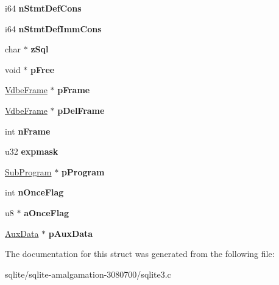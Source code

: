 \begin{DoxyCompactItemize}
\item 
\hypertarget{struct_vdbe_ab6a710cd4796c6adc8967e7b5bf35757}{i64 {\bfseries n\+Stmt\+Def\+Cons}}\label{struct_vdbe_ab6a710cd4796c6adc8967e7b5bf35757}

\item 
\hypertarget{struct_vdbe_acc12695377eb8b25107876145704c496}{i64 {\bfseries n\+Stmt\+Def\+Imm\+Cons}}\label{struct_vdbe_acc12695377eb8b25107876145704c496}

\item 
\hypertarget{struct_vdbe_a5a61fd8f84ae0399ef73327e48048ae9}{char $\ast$ {\bfseries z\+Sql}}\label{struct_vdbe_a5a61fd8f84ae0399ef73327e48048ae9}

\item 
\hypertarget{struct_vdbe_a68dcaae5d4f061da3d7bb96c120fe9a4}{void $\ast$ {\bfseries p\+Free}}\label{struct_vdbe_a68dcaae5d4f061da3d7bb96c120fe9a4}

\item 
\hypertarget{struct_vdbe_afd754aaedd6cd5b229fbeff33177fe04}{\hyperlink{struct_vdbe_frame}{Vdbe\+Frame} $\ast$ {\bfseries p\+Frame}}\label{struct_vdbe_afd754aaedd6cd5b229fbeff33177fe04}

\item 
\hypertarget{struct_vdbe_ab8f22136c8bdb4c02962a1ae081e9116}{\hyperlink{struct_vdbe_frame}{Vdbe\+Frame} $\ast$ {\bfseries p\+Del\+Frame}}\label{struct_vdbe_ab8f22136c8bdb4c02962a1ae081e9116}

\item 
\hypertarget{struct_vdbe_a27fbd083a0335ac2b332d37ea2b90bdc}{int {\bfseries n\+Frame}}\label{struct_vdbe_a27fbd083a0335ac2b332d37ea2b90bdc}

\item 
\hypertarget{struct_vdbe_a5e22eedb6ee963a0bcf27fc9fd8b8e43}{u32 {\bfseries expmask}}\label{struct_vdbe_a5e22eedb6ee963a0bcf27fc9fd8b8e43}

\item 
\hypertarget{struct_vdbe_a9239ea72573142101328be15c90de62b}{\hyperlink{struct_sub_program}{Sub\+Program} $\ast$ {\bfseries p\+Program}}\label{struct_vdbe_a9239ea72573142101328be15c90de62b}

\item 
\hypertarget{struct_vdbe_a55e673e0ba209872b23c64c87b36bf56}{int {\bfseries n\+Once\+Flag}}\label{struct_vdbe_a55e673e0ba209872b23c64c87b36bf56}

\item 
\hypertarget{struct_vdbe_a015887ad1c7c597fb78dc08060cb3dc6}{u8 $\ast$ {\bfseries a\+Once\+Flag}}\label{struct_vdbe_a015887ad1c7c597fb78dc08060cb3dc6}

\item 
\hypertarget{struct_vdbe_a43c515d3521658be7f7e33e4eb2aa136}{\hyperlink{struct_aux_data}{Aux\+Data} $\ast$ {\bfseries p\+Aux\+Data}}\label{struct_vdbe_a43c515d3521658be7f7e33e4eb2aa136}

\end{DoxyCompactItemize}


The documentation for this struct was generated from the following file\+:\begin{DoxyCompactItemize}
\item 
sqlite/sqlite-\/amalgamation-\/3080700/sqlite3.\+c\end{DoxyCompactItemize}
